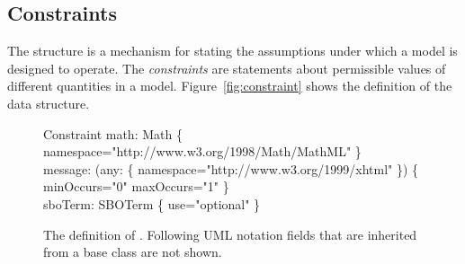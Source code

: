 %
%
%
%
%
%
%
%
%
%
%
%
%


\subsection{Constraints}
\label{sec:constraints}

The \Constraint structure is a mechanism for stating the
assumptions under which a model is designed to operate.  The
\emph{constraints} are statements about permissible values of
different quantities in a model.  Figure~\vref{fig:constraint}
shows the definition of the \Constraint data structure.

\begin{figure}[htb]
  \centering
  \small
  \begin{classbox}{Constraint}
    math: Math \{ namespace="http://www.w3.org/1998/Math/MathML" \} \\
    message: (any: \{ namespace="http://www.w3.org/1999/xhtml" \}) \{ minOccurs="0" maxOccurs="1" \} \\
    sboTerm: SBOTerm \{ use="optional" \} \\
  \end{classbox}
  \caption{The definition of \Constraint.
    Following UML notation fields
    that are inherited from a base class are not shown.}
  \label{fig:constraint}
\end{figure}


